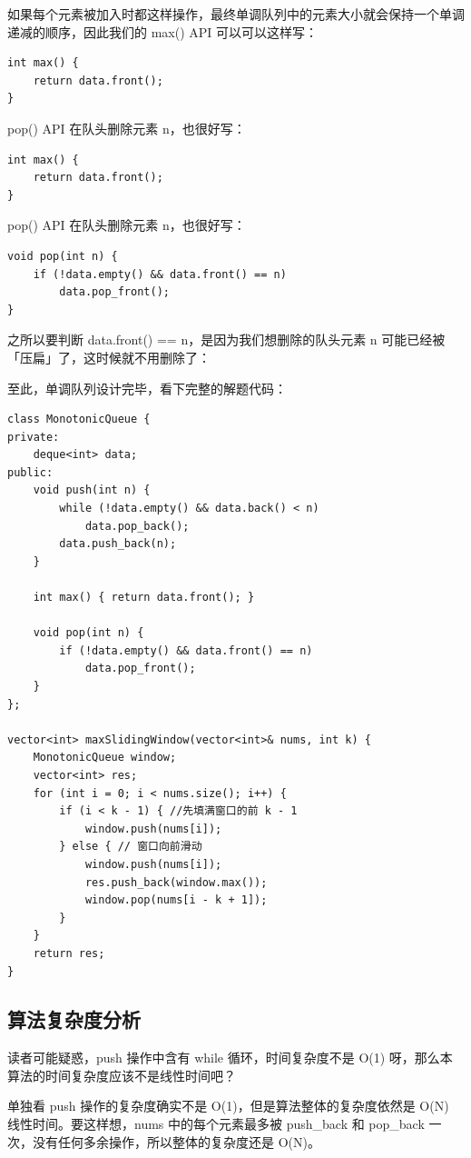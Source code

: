 \documentclass[12pt]{article}
\begin{document}
如果每个元素被加入时都这样操作，最终单调队列中的元素大小就会保持一个单调递减的顺序，因此我们的 max() API 可以可以这样写：
\begin{lstlisting}
int max() {
    return data.front();
}
\end{lstlisting}

pop() API 在队头删除元素 n，也很好写：
\begin{lstlisting}
int max() {
    return data.front();
}
\end{lstlisting}

pop() API 在队头删除元素 n，也很好写：
\begin{lstlisting}
void pop(int n) {
    if (!data.empty() && data.front() == n)
        data.pop_front();
}
\end{lstlisting}

之所以要判断 data.front() == n，是因为我们想删除的队头元素 n 可能已经被「压扁」了，这时候就不用删除了：

至此，单调队列设计完毕，看下完整的解题代码：
\begin{lstlisting}
class MonotonicQueue {
private:
    deque<int> data;
public:
    void push(int n) {
        while (!data.empty() && data.back() < n) 
            data.pop_back();
        data.push_back(n);
    }
    
    int max() { return data.front(); }
    
    void pop(int n) {
        if (!data.empty() && data.front() == n)
            data.pop_front();
    }
};

vector<int> maxSlidingWindow(vector<int>& nums, int k) {
    MonotonicQueue window;
    vector<int> res;
    for (int i = 0; i < nums.size(); i++) {
        if (i < k - 1) { //先填满窗口的前 k - 1
            window.push(nums[i]);
        } else { // 窗口向前滑动
            window.push(nums[i]);
            res.push_back(window.max());
            window.pop(nums[i - k + 1]);
        }
    }
    return res;
}
\end{lstlisting}

\subsection{算法复杂度分析}
读者可能疑惑，push 操作中含有 while 循环，时间复杂度不是 O(1) 呀，那么本算法的时间复杂度应该不是线性时间吧？

单独看 push 操作的复杂度确实不是 O(1)，但是算法整体的复杂度依然是 O(N) 线性时间。要这样想，nums 中的每个元素最多被 push\_back 和 pop\_back 一次，没有任何多余操作，所以整体的复杂度还是 O(N)。
\end{document}
